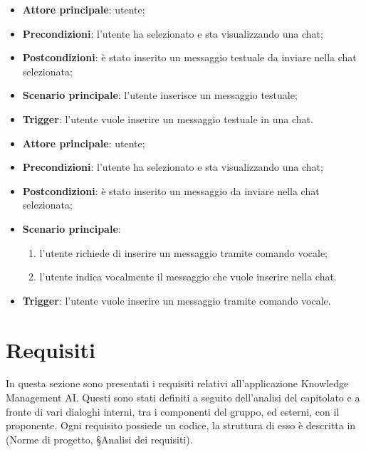 \documentclass[10pt, a4paper]{article}
\begin{document}
    \begin{itemize}
        \item \textbf{Attore principale}: utente;
        \item \textbf{Precondizioni}: l’utente ha selezionato e sta visualizzando una chat;
        \item \textbf{Postcondizioni}: è stato inserito un messaggio testuale da inviare nella chat selezionata;
        \item \textbf{Scenario principale}: l’utente inserisce un messaggio testuale;
        \item \textbf{Trigger}: l’utente vuole inserire un messaggio testuale in una chat.
    \end{itemize}
    
    \begin{itemize}
        \item \textbf{Attore principale}: utente;
        \item \textbf{Precondizioni}: l’utente ha selezionato e sta visualizzando una chat;
        \item \textbf{Postcondizioni}: è stato inserito un messaggio da inviare nella chat selezionata;
        \item \textbf{Scenario principale}:
            \begin{enumerate}
                \item l’utente richiede di inserire un messaggio tramite comando vocale;
                \item l’utente indica vocalmente il messaggio che vuole inserire nella chat.
            \end{enumerate}
        \item \textbf{Trigger}: l’utente vuole inserire un messaggio tramite comando vocale.
    \end{itemize}


\newpage
\section{Requisiti}
In questa sezione sono presentati i requisiti relativi all’applicazione Knowledge Management AI. Questi sono stati definiti a seguito dell’analisi del capitolato e a fronte di vari dialoghi interni, tra i componenti del gruppo, ed esterni, con il proponente. Ogni requisito possiede un codice, la struttura di esso è descritta in (Norme di progetto, \S Analisi dei requisiti).
\end{document}
